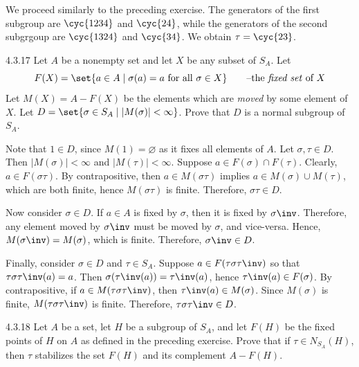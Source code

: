 \begin{sol}
	We proceed similarly to the preceding exercise.
	The generators of the first subgroup are $\cyc{1 2 3 4}$ and $\cyc{2 4}$, while the generators of the second subgrgoup are $\cyc{1 3 2 4}$ and $\cyc{3 4}$.
	We obtain $\tau = \cyc{2 3}$.
\end{sol}

\begin{spex}{4.3.17}
	Let $A$ be a nonempty set and let $X$ be any subset of $S_A$.
	Let
	\[
		F(X) = \set{a \in A \mid \sigma(a) = a \text{ for all } \sigma \in X} \qquad \text{--the \emph{fixed set} of $X$}
	\]
	Let $M(X) = A - F(X)$ be the elements which are \emph{moved} by some element of $X$.
	Let $D = \set{\sigma \in S_A \mid |M(\sigma)| < \infty}$.
	Prove that $D$ is a normal subgroup of $S_A$.
\end{spex}

\begin{sol}[spsol]
	Note that $1 \in D$, since $M(1) = \varnothing$ as it fixes all elements of $A$.
	Let $\sigma, \tau \in D$.
	Then $|M(\sigma)| < \infty$ and $|M(\tau)| < \infty$.
	Suppose $a \in F(\sigma) \cap F(\tau)$.
	Clearly, $a \in F(\sigma\tau)$.
	By contrapositive, then $a \in M(\sigma\tau)$ implies $a \in M(\sigma) \cup M(\tau)$, which are both finite, hence $M(\sigma\tau)$ is finite.
	Therefore, $\sigma\tau \in D$.
	
	Now consider $\sigma \in D$.
	If $a \in A$ is fixed by $\sigma$, then it is fixed by $\sigma\inv$.
	Therefore, any element moved by $\sigma\inv$ must be moved by $\sigma$, and vice-versa.
	Hence, $M(\sigma\inv) = M(\sigma)$, which is finite.
	Therefore, $\sigma\inv \in D$.

	Finally, consider $\sigma \in D$ and $\tau \in S_A$.
	Suppose $a \in F(\tau\sigma\tau\inv)$ so that $\tau\sigma\tau\inv(a) = a$.
	Then $\sigma(\tau\inv(a)) = \tau\inv(a)$, hence $\tau\inv(a) \in F(\sigma)$.
	By contrapositive, if $a \in M(\tau\sigma\tau\inv)$, then $\tau\inv(a) \in M(\sigma)$.
	Since $M(\sigma)$ is finite, $M(\tau\sigma\tau\inv)$ is finite.
	Therefore, $\tau\sigma\tau\inv \in D$.
\end{sol}

\begin{exercise}{4.3.18}
	Let $A$ be a set, let $H$ be a subgroup of $S_A$, and let $F(H)$ be the fixed points of $H$ on $A$ as defined in the preceding exercise.
	Prove that if $\tau \in N_{S_A}(H)$, then $\tau$ stabilizes the set $F(H)$ and its complement $A - F(H)$.
\end{exercise}

